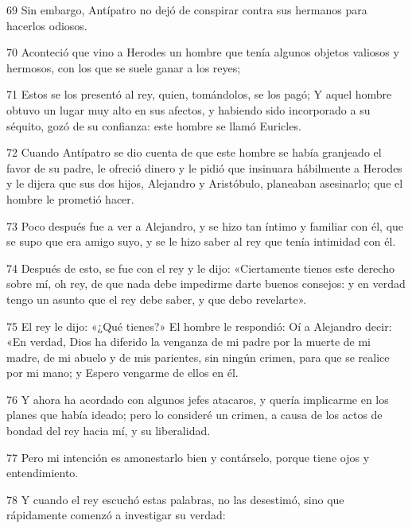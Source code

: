 \par 69 Sin embargo, Antípatro no dejó de conspirar contra sus hermanos para hacerlos odiosos.

\par 70 Aconteció que vino a Herodes un hombre que tenía algunos objetos valiosos y hermosos, con los que se suele ganar a los reyes;

\par 71 Estos se los presentó al rey, quien, tomándolos, se los pagó; Y aquel hombre obtuvo un lugar muy alto en sus afectos, y habiendo sido incorporado a su séquito, gozó de su confianza: este hombre se llamó Euricles.

\par 72 Cuando Antípatro se dio cuenta de que este hombre se había granjeado el favor de su padre, le ofreció dinero y le pidió que insinuara hábilmente a Herodes y le dijera que sus dos hijos, Alejandro y Aristóbulo, planeaban asesinarlo; que el hombre le prometió hacer.

\par 73 Poco después fue a ver a Alejandro, y se hizo tan íntimo y familiar con él, que se supo que era amigo suyo, y se le hizo saber al rey que tenía intimidad con él.

\par 74 Después de esto, se fue con el rey y le dijo: «Ciertamente tienes este derecho sobre mí, oh rey, de que nada debe impedirme darte buenos consejos: y en verdad tengo un asunto que el rey debe saber, y que debo revelarte».

\par 75 El rey le dijo: «¿Qué tienes?» El hombre le respondió: Oí a Alejandro decir: «En verdad, Dios ha diferido la venganza de mi padre por la muerte de mi madre, de mi abuelo y de mis parientes, sin ningún crimen, para que se realice por mi mano; y Espero vengarme de ellos en él.

\par 76 Y ahora ha acordado con algunos jefes atacaros, y quería implicarme en los planes que había ideado; pero lo consideré un crimen, a causa de los actos de bondad del rey hacia mí, y su liberalidad.

\par 77 Pero mi intención es amonestarlo bien y contárselo, porque tiene ojos y entendimiento.

\par 78 Y cuando el rey escuchó estas palabras, no las desestimó, sino que rápidamente comenzó a investigar su verdad:

